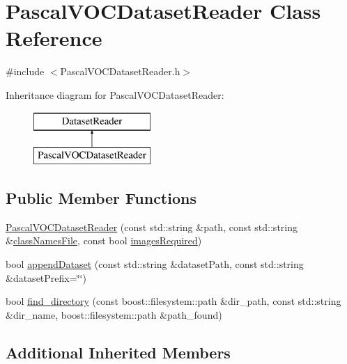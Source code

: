 \hypertarget{class_pascal_v_o_c_dataset_reader}{}\section{Pascal\+V\+O\+C\+Dataset\+Reader Class Reference}
\label{class_pascal_v_o_c_dataset_reader}


{\ttfamily \#include $<$Pascal\+V\+O\+C\+Dataset\+Reader.\+h$>$}

Inheritance diagram for Pascal\+V\+O\+C\+Dataset\+Reader\+:\begin{figure}[H]
\begin{center}
\leavevmode
\includegraphics[height=2.000000cm]{class_pascal_v_o_c_dataset_reader}
\end{center}
\end{figure}
\subsection*{Public Member Functions}
\begin{DoxyCompactItemize}
\item 
\hyperlink{class_pascal_v_o_c_dataset_reader_ae0a8634aa9fbd308e6c1a1ecb60a7c89}{Pascal\+V\+O\+C\+Dataset\+Reader} (const std\+::string \&path, const std\+::string \&\hyperlink{class_dataset_reader_a45ded43b56539f1e37a24ca9c94b4611}{class\+Names\+File}, const bool \hyperlink{class_dataset_reader_a71d04d25d58e0e9a0c05d69afcff03a1}{images\+Required})
\item 
bool \hyperlink{class_pascal_v_o_c_dataset_reader_a845b70b47078741f29d8e348c3c48467}{append\+Dataset} (const std\+::string \&dataset\+Path, const std\+::string \&dataset\+Prefix=\char`\"{}\char`\"{})
\item 
bool \hyperlink{class_pascal_v_o_c_dataset_reader_a3b3e05816606147534b8af5b8c28bb29}{find\+\_\+directory} (const boost\+::filesystem\+::path \&dir\+\_\+path, const std\+::string \&dir\+\_\+name, boost\+::filesystem\+::path \&path\+\_\+found)
\end{DoxyCompactItemize}
\subsection*{Additional Inherited Members}


